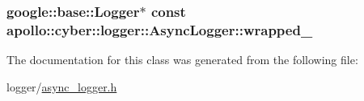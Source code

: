 \hypertarget{classapollo_1_1cyber_1_1logger_1_1AsyncLogger_a4d7679337ba167a45f75c006f9c2f340}{
\subsubsection[{wrapped\-\_\-}]{\setlength{\rightskip}{0pt plus 5cm}google\-::base\-::\-Logger$\ast$ const apollo\-::cyber\-::logger\-::\-Async\-Logger\-::wrapped\-\_\-\hspace{0.3cm}{\ttfamily [private]}}}\label{classapollo_1_1cyber_1_1logger_1_1AsyncLogger_a4d7679337ba167a45f75c006f9c2f340}


The documentation for this class was generated from the following file\-:\begin{DoxyCompactItemize}
\item 
logger/\hyperlink{async__logger_8h}{async\-\_\-logger.\-h}\end{DoxyCompactItemize}
